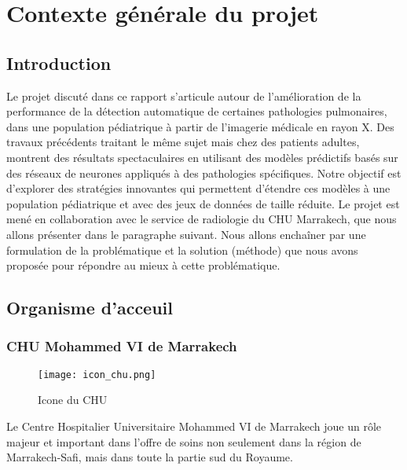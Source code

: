 \chapter{Contexte générale du projet}

    \section*{Introduction}
    Le projet discuté dans ce rapport s’articule autour de l’amélioration de la performance de la détection automatique de certaines pathologies pulmonaires, dans une population pédiatrique à partir de l’imagerie médicale en rayon X. Des travaux précédents traitant le même sujet mais chez des patients adultes, montrent des résultats spectaculaires en utilisant des modèles prédictifs basés sur des réseaux de neurones appliqués à des pathologies spécifiques. Notre objectif est d’explorer des stratégies innovantes qui permettent d’étendre ces modèles à une population pédiatrique et avec des jeux de données de taille réduite. Le projet est mené en collaboration avec le service de radiologie du CHU Marrakech, que nous allons présenter dans le paragraphe suivant. Nous allons enchaîner par une formulation de la problématique et la solution (méthode) que nous avons proposée pour répondre au mieux à cette problématique.

    \section{Organisme d'acceuil}

        \subsection{CHU Mohammed VI de Marrakech}
            \begin{figure}[h]
                \centering
                \texttt{[image: icon\_chu.png]}\label{fig:chu}
                \caption{Icone du CHU}
            \end{figure}
            Le Centre Hospitalier Universitaire Mohammed VI de Marrakech joue un rôle  majeur et important dans l’offre de soins non seulement dans la région de Marrakech-Safi, mais  dans toute la partie sud du Royaume.

